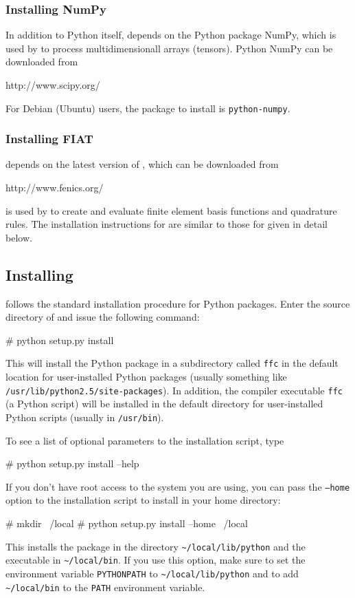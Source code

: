 \subsubsection{Installing NumPy}

In addition to Python itself, \ffc{} depends on the Python package NumPy,
which is used by \ffc{} to process multidimensionall arrays (tensors).
Python NumPy can be downloaded from
\begin{code}
http://www.scipy.org/
\end{code}
For Debian (Ubuntu) users, the package to install is \texttt{python-numpy}.

\subsubsection{Installing FIAT}

\ffc{} depends on the latest version of \fiat{}, which can be
downloaded from
\begin{code}
http://www.fenics.org/
\end{code}
\fiat{} is used by \ffc{} to create and evaluate finite element basis
functions and quadrature rules.
The installation instructions for \fiat{} are similar to those for
\ffc{} given in detail below.



\subsection{Installing \ffc{}}

\ffc{} follows the standard installation procedure for Python
packages. Enter the source directory of \ffc{} and issue the
following command:
\begin{code}
# python setup.py install
\end{code}
This will install the \ffc{} Python package in a subdirectory called
\texttt{ffc} in the default location for user-installed Python
packages (usually something like
\texttt{/usr/lib/python2.5/site-packages}).  In addition, the compiler
executable \texttt{ffc} (a Python script) will be installed in the
default directory for user-installed Python scripts (usually in
\texttt{/usr/bin}).

To see a list of optional parameters to the installation script, type
\begin{code}
# python setup.py install --help
\end{code}
If you don't have root access to the system you are using, you can
pass the \texttt{--home} option to the installation script to install
\ffc{} in your home directory:
\begin{code}
# mkdir ~/local
# python setup.py install --home ~/local
\end{code}
This installs the \ffc{} package in the directory \texttt{\~{}/local/lib/python}
and the \ffc{} executable in \texttt{\~{}/local/bin}. If you use this
option, make sure to set the environment variable \texttt{PYTHONPATH}
to \texttt{\~{}/local/lib/python} and to add \texttt{\~{}/local/bin}
to the \texttt{PATH} environment variable.

